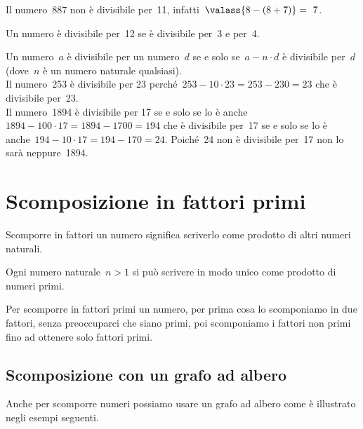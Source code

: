 \begin{description} [noitemsep]
Il numero~887 non è divisibile per~11, infatti~\(\valass{8-(8+7)}=~7\).
\item[12:~] Un numero è divisibile per~12 se è 
divisibile 
per~3 e per~4.
\item[un numero qualunque:~] Un numero~\(a\) è divisibile 
per un numero~\(d\) se e solo se~\(a - n \cdot d\) è divisibile per~\(d\) 
(dove~\(n\) è un numero naturale qualsiasi).\\
Il numero~253 è divisibile per 23 
perché~\(253 - 10 \cdot 23 = 253 - 230 = 23\) che è divisibile per~23.\\
Il numero~1894 è divisibile per 17 se e solo se lo è 
anche~\(1894 - 100 \cdot 17 = 1894 - 1700 = 194\) 
che è divisibile per~17 se e solo se lo è
anche~\(194 - 10 \cdot 17 = 194 - 170 = 24\). 
Poiché~24 non è divisibile per~17 non lo sarà neppure~1894.
\end{description}


\pagebreak

\section{Scomposizione in fattori primi}
\label{sec:01_scomposizione}

Scomporre in fattori un numero significa scriverlo come prodotto di altri 
numeri naturali. 


\begin{teorema}
 Ogni numero naturale~\(n>1\) si può scrivere in modo unico come prodotto di 
 numeri primi.
\end{teorema}

Per scomporre in fattori primi un numero, per prima cosa lo scomponiamo in 
due fattori, senza preoccuparci che siano primi, poi scomponiamo i fattori
non primi fino ad ottenere solo fattori primi.

\subsection{Scomposizione con un grafo ad albero}

Anche per scomporre numeri possiamo usare un grafo ad albero come è 
illustrato negli esempi seguenti.


